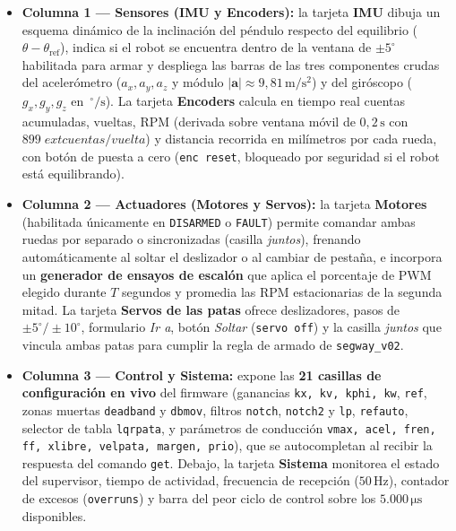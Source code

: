 \documentclass[11pt,a4paper]{report}
\newcommand{\ud}[1]{\,\mathrm{#1}}
\begin{document}
\begin{itemize}[leftmargin=1.5em]
\item \textbf{Columna 1 — Sensores (IMU y Encoders):} la tarjeta \textbf{IMU} dibuja un esquema
      dinámico de la inclinación del péndulo respecto del equilibrio ($\theta - \theta_{\text{ref}}$),
      indica si el robot se encuentra dentro de la ventana de $\pm 5^\circ$ habilitada para armar
      y despliega las barras de las tres componentes crudas del acelerómetro ($a_x, a_y, a_z$ y
      módulo $|\boldsymbol{a}| \approx 9{,}81\ud{m/s^2}$) y del giróscopo ($g_x, g_y, g_z$ en
      $\ud{^\circ/s}$). La tarjeta \textbf{Encoders} calcula en tiempo real cuentas acumuladas,
      vueltas, RPM (derivada sobre ventana móvil de $0{,}2\ud{s}$ con $899\;	ext{cuentas/vuelta}$)
      y distancia recorrida en milímetros por cada rueda, con botón de puesta a cero (\texttt{enc reset},
      bloqueado por seguridad si el robot está equilibrando).
\item \textbf{Columna 2 — Actuadores (Motores y Servos):} la tarjeta \textbf{Motores} (habilitada
      únicamente en \texttt{DISARMED} o \texttt{FAULT}) permite comandar ambas ruedas por separado
      o sincronizadas (casilla \emph{juntos}), frenando automáticamente al soltar el deslizador o
      al cambiar de pestaña, e incorpora un \textbf{generador de ensayos de escalón} que aplica el
      porcentaje de PWM elegido durante $T$ segundos y promedia las RPM estacionarias de la segunda
      mitad. La tarjeta \textbf{Servos de las patas} ofrece deslizadores, pasos de $\pm 5^\circ/\pm 10^\circ$,
      formulario \emph{Ir a}, botón \emph{Soltar} (\texttt{servo off}) y la casilla \emph{juntos}
      que vincula ambas patas para cumplir la regla de armado de \texttt{segway\_v02}.
\item \textbf{Columna 3 — Control y Sistema:} expone las \textbf{21 casillas de configuración en
      vivo} del firmware (ganancias \texttt{kx, kv, kphi, kw}, \texttt{ref}, zonas muertas
      \texttt{deadband} y \texttt{dbmov}, filtros \texttt{notch}, \texttt{notch2} y \texttt{lp},
      \texttt{refauto}, selector de tabla \texttt{lqrpata}, y parámetros de conducción
      \texttt{vmax, acel, fren, ff, xlibre, velpata, margen, prio}), que se autocompletan al
      recibir la respuesta del comando \texttt{get}. Debajo, la tarjeta \textbf{Sistema} monitorea
      el estado del supervisor, tiempo de actividad, frecuencia de recepción ($50\ud{Hz}$),
      contador de excesos (\texttt{overruns}) y barra del peor ciclo de control sobre los
      $5.000\ud{\mu s}$ disponibles.
\end{itemize}
\end{document}
